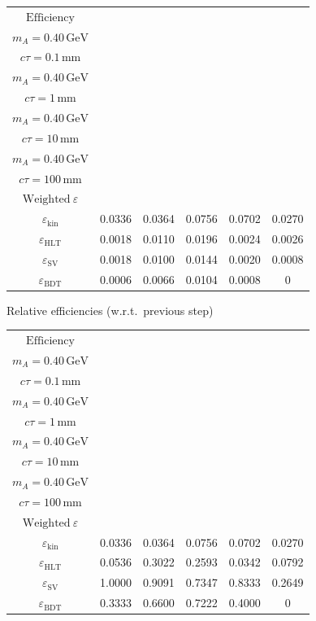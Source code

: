\documentclass[10pt,a4paper]{article}
\begin{document}
{\begin{tabular}{cccccc}
\toprule
$\mathrm{Efficiency}$ & \shortstack{$m_{\pi}=4\,\mathrm{GeV}$\\$m_{A}=0.40\,\mathrm{GeV}$\\$c\tau=0.1\,\mathrm{mm}$} & \shortstack{$m_{\pi}=4\,\mathrm{GeV}$\\$m_{A}=0.40\,\mathrm{GeV}$\\$c\tau=1\,\mathrm{mm}$} & \shortstack{$m_{\pi}=4\,\mathrm{GeV}$\\$m_{A}=0.40\,\mathrm{GeV}$\\$c\tau=10\,\mathrm{mm}$} & \shortstack{$m_{\pi}=4\,\mathrm{GeV}$\\$m_{A}=0.40\,\mathrm{GeV}$\\$c\tau=100\,\mathrm{mm}$} & \shortstack{$\mathrm{QCD}$\\$\mathrm{Weighted}\ \varepsilon$} \\
\midrule
$\varepsilon_{\mathrm{kin}}$ & 0.0336 & 0.0364 & 0.0756 & 0.0702 & 0.0270\\
$\varepsilon_{\mathrm{HLT}}$ & 0.0018 & 0.0110 & 0.0196 & 0.0024 & 0.0026\\
$\varepsilon_{\mathrm{SV}}$ & 0.0018 & 0.0100 & 0.0144 & 0.0020 & 0.0008\\
$\varepsilon_{\mathrm{BDT}}$ & 0.0006 & 0.0066 & 0.0104 & 0.0008 & $0$\\
\bottomrule
\end{tabular}

\vspace{18pt}

Relative efficiencies (w.r.t.\ previous step)

\begin{tabular}{cccccc}
\toprule
$\mathrm{Efficiency}$ & \shortstack{$m_{\pi}=4\,\mathrm{GeV}$\\$m_{A}=0.40\,\mathrm{GeV}$\\$c\tau=0.1\,\mathrm{mm}$} & \shortstack{$m_{\pi}=4\,\mathrm{GeV}$\\$m_{A}=0.40\,\mathrm{GeV}$\\$c\tau=1\,\mathrm{mm}$} & \shortstack{$m_{\pi}=4\,\mathrm{GeV}$\\$m_{A}=0.40\,\mathrm{GeV}$\\$c\tau=10\,\mathrm{mm}$} & \shortstack{$m_{\pi}=4\,\mathrm{GeV}$\\$m_{A}=0.40\,\mathrm{GeV}$\\$c\tau=100\,\mathrm{mm}$} & \shortstack{$\mathrm{QCD}$\\$\mathrm{Weighted}\ \varepsilon$} \\
\midrule
$\varepsilon_{\mathrm{kin}}$ & 0.0336 & 0.0364 & 0.0756 & 0.0702 & 0.0270\\
$\varepsilon_{\mathrm{HLT}}$ & 0.0536 & 0.3022 & 0.2593 & 0.0342 & 0.0792\\
$\varepsilon_{\mathrm{SV}}$ & 1.0000 & 0.9091 & 0.7347 & 0.8333 & 0.2649\\
$\varepsilon_{\mathrm{BDT}}$ & 0.3333 & 0.6600 & 0.7222 & 0.4000 & $0$\\
\bottomrule
\end{tabular}

}
\end{document}

